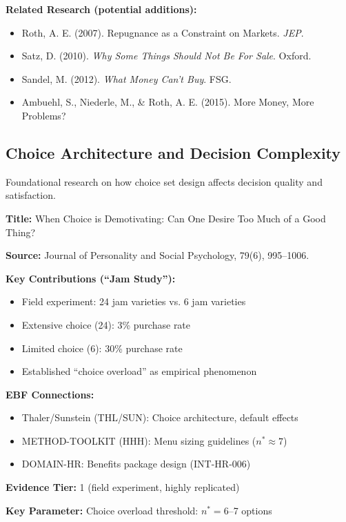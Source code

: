 \textbf{Related Research (potential additions):}
\begin{itemize}
    \item Roth, A. E. (2007). Repugnance as a Constraint on Markets. \textit{JEP}.
    \item Satz, D. (2010). \textit{Why Some Things Should Not Be For Sale}. Oxford.
    \item Sandel, M. (2012). \textit{What Money Can't Buy}. FSG.
    \item Ambuehl, S., Niederle, M., \& Roth, A. E. (2015). More Money, More Problems?
\end{itemize}

\subsection{Choice Architecture and Decision Complexity}
\label{subsec:ot-choice-architecture}

Foundational research on how choice set design affects decision quality and satisfaction.

\begin{tcolorbox}[colback=yellow!5!white,colframe=yellow!75!black,title=Key Paper: Iyengar \& Lepper (2000)]
\textbf{Title:} When Choice is Demotivating: Can One Desire Too Much of a Good Thing?

\textbf{Source:} Journal of Personality and Social Psychology, 79(6), 995--1006.

\textbf{Key Contributions (``Jam Study''):}
\begin{itemize}
    \item Field experiment: 24 jam varieties vs. 6 jam varieties
    \item Extensive choice (24): 3\% purchase rate
    \item Limited choice (6): 30\% purchase rate
    \item Established ``choice overload'' as empirical phenomenon
\end{itemize}

\textbf{EBF Connections:}
\begin{itemize}
    \item Thaler/Sunstein (THL/SUN): Choice architecture, default effects
    \item METHOD-TOOLKIT (HHH): Menu sizing guidelines ($n^* \approx 7$)
    \item DOMAIN-HR: Benefits package design (INT-HR-006)
\end{itemize}

\textbf{Evidence Tier:} 1 (field experiment, highly replicated)

\textbf{Key Parameter:} Choice overload threshold: $n^* = 6$--7 options
\end{tcolorbox}


